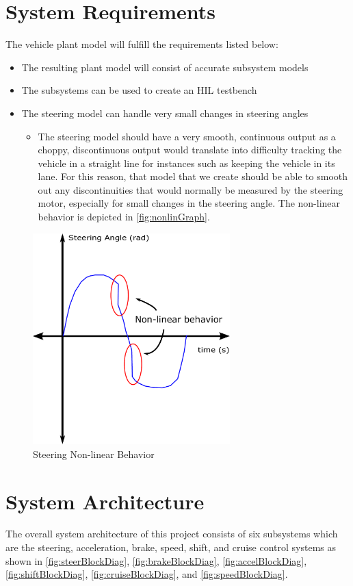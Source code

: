 \documentclass[letterpaper,12pt]{article}   %
\begin{document}
\section{System Requirements}
The vehicle plant model will fulfill the requirements listed below:
\begin{itemize}
    \item The resulting plant model will consist of accurate subsystem models
    \item The subsystems can be used to create an HIL testbench
    \item The steering model can handle very small changes in steering angles
    \begin{itemize}
    		\item The steering model should have a very smooth, continuous output as a choppy, discontinuous output would translate into difficulty tracking the vehicle in a straight line for instances such as keeping the vehicle in its lane. For this reason, that model that we create should be able to smooth out any discontinuities that would normally be measured by the steering motor, especially for small changes in the steering angle. The non-linear behavior is depicted in \autoref{fig:nonlinGraph}.
    \end{itemize}
\end{itemize}
\begin{figure}[h]
    \centering
    \captionsetup{justification=centering, margin=3cm}
    \includegraphics[width=3in]{figs/inkscape/nonlinearBehavior}
    \caption{Steering Non-linear Behavior}
    \label{fig:nonlinGraph}
\end{figure}


\section{System Architecture}
The overall system architecture of this project consists of six subsystems which are the steering, acceleration, brake, speed, shift, and cruise control systems as shown in \autoref{fig:steerBlockDiag}, \autoref{fig:brakeBlockDiag}, \autoref{fig:accelBlockDiag}, \autoref{fig:shiftBlockDiag}, \autoref{fig:cruiseBlockDiag}, and \autoref{fig:speedBlockDiag}.
\end{document}
